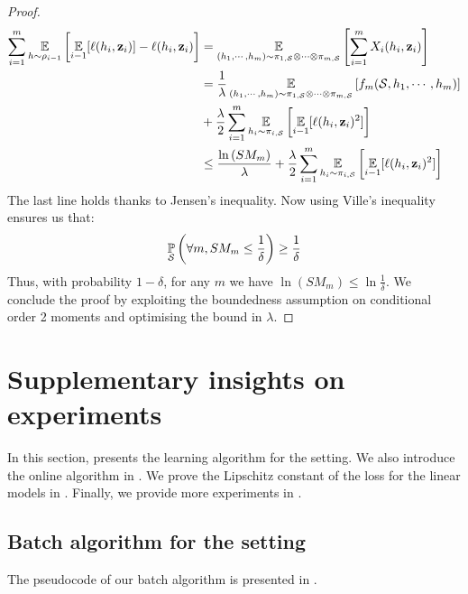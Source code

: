 \documentclass{article}
\begin{document}
\begin{proof}
    \begin{align*}
        \sum_{i=1}^{m}\operatorname*{\mathbb{E}}_{h\sim\rho_{i-1}}\left[\operatorname*{\mathbb{E}}_{i-1}[\ell(h_i,\mathbf{z}_i)]-\ell(h_i, \mathbf{z}_i)\right] &= \operatorname*{\mathbb{E}}_{(h_1,\cdots,h_m) \sim \pi_{1,\mathcal{S}} \otimes \cdots \otimes \pi_{m,\mathcal{S}}} \left[\sum_{i=1}^m X_i(h_i,\mathbf{z}_i)\right] \\
        & = \frac{1}{\lambda}\operatorname*{\mathbb{E}}_{(h_1,\cdots,h_m) \sim \pi_{1,\mathcal{S}} \otimes \cdots \otimes \pi_{m,\mathcal{S}}} \left[ f_m (\mathcal{S},h_1,\cdots,h_m)\right] \\
        & + \frac{\lambda}{2} \sum_{i=1}^m \operatorname*{\mathbb{E}}_{h_i\sim \pi_{i,\mathcal{S}}}\left[ \operatorname*{\mathbb{E}}_{i-1}[\ell(h_i, \mathbf{z}_i)^2] \right] \\
        & \leq \frac{\ln\left( SM_m \right)}{\lambda} + \frac{\lambda}{2} \sum_{i=1}^m \operatorname*{\mathbb{E}}_{h_i\sim \pi_{i,\mathcal{S}}}\left[ \operatorname*{\mathbb{E}}_{i-1}[\ell(h_i, \mathbf{z}_i)^2] \right]
    \end{align*}
    The last line holds thanks to Jensen's inequality.
    Now using Ville's inequality ensures us that:
    \begin{align*}
    \operatorname*{\mathbb{P}}_{\mathcal{S}}\left( \forall m, SM_m \leq \frac{1}{\delta} \right) \geq \frac{1}{\delta}
    \end{align*}
    Thus, with probability $1{-}\delta$, for any $m$ we have $\ln(SM_m){\leq}\ln\frac{1}{\delta}$. 
    We conclude the proof by exploiting the boundedness assumption on conditional order 2 moments and optimising the bound in $\lambda$. 
\end{proof}

\section{Supplementary insights on experiments}
\label{sec:supplementary-expes}

In this section,  presents the learning algorithm for the \iid setting.
We also introduce the online algorithm in .
We prove the Lipschitz constant of the loss for the linear models in .
Finally, we provide more experiments in .

\subsection{Batch algorithm for the \iid setting}
\label{sec:alg-batch}

The pseudocode of our batch algorithm is presented in .
\end{document}
